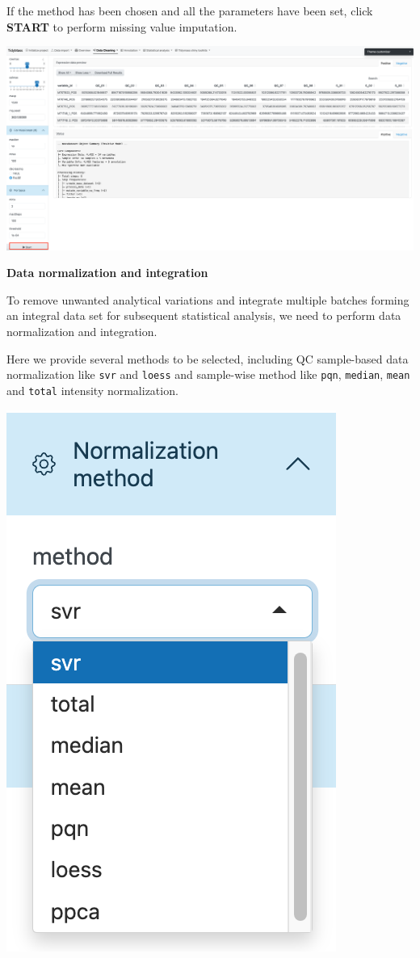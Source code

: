 \documentclass[
]{book}
\begin{document}
If the method has been chosen and all the parameters have been set, click \textbf{START} to perform missing value imputation.

\includegraphics{figures/imputation2.png}

\textbf{Data normalization and integration}

To remove unwanted analytical variations and integrate multiple batches forming an integral data set for subsequent statistical analysis, we need to perform data normalization and integration.

Here we provide several methods to be selected, including QC sample-based data normalization like \texttt{svr} and \texttt{loess} and sample-wise method like \texttt{pqn}, \texttt{median}, \texttt{mean} and \texttt{total} intensity normalization.

\includegraphics{figures/normalization_methods.png}
\end{document}
